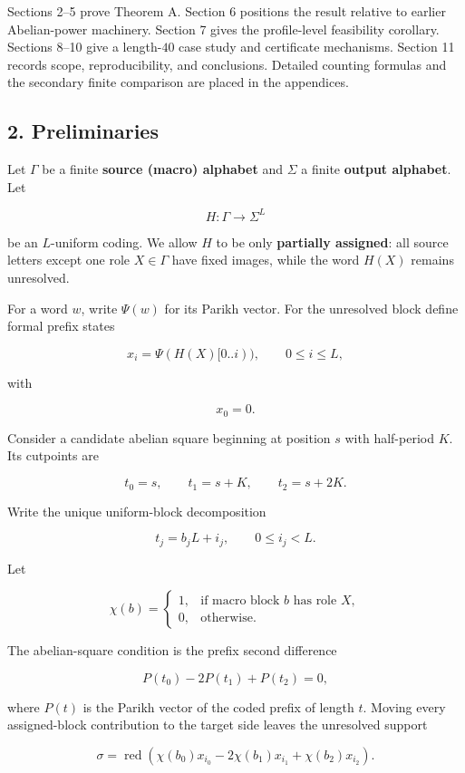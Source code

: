 \documentclass[
  british,
  a4paper,
  11pt]{article}
\begin{document}
Sections 2--5 prove Theorem A. Section 6 positions the result relative
to earlier Abelian-power machinery. Section 7 gives the profile-level
feasibility corollary. Sections 8--10 give a length-\(40\) case study
and certificate mechanisms. Section 11 records scope, reproducibility,
and conclusions. Detailed counting formulas and the secondary finite
comparison are placed in the appendices.

\subsection{2. Preliminaries}\label{preliminaries}

Let \(\Gamma\) be a finite \textbf{source (macro) alphabet} and
\(\Sigma\) a finite \textbf{output alphabet}. Let

\[
H:\Gamma\to\Sigma^L
\]

be an \(L\)-uniform coding. We allow \(H\) to be only \textbf{partially
assigned}: all source letters except one role \(X\in\Gamma\) have fixed
images, while the word \(H(X)\) remains unresolved.

For a word \(w\), write \(\Psi(w)\) for its Parikh vector. For the
unresolved block define formal prefix states

\[
x_i=\Psi(H(X)[0..i)),
\qquad
0\le i\le L,
\]

with

\[
x_0=0.
\]

Consider a candidate abelian square beginning at position \(s\) with
half-period \(K\). Its cutpoints are

\[
t_0=s,\qquad t_1=s+K,\qquad t_2=s+2K.
\]

Write the unique uniform-block decomposition

\[
t_j=b_jL+i_j,
\qquad
0\le i_j<L.
\]

Let

\[
\chi(b)=
\begin{cases}
1,&\text{if macro block }b\text{ has role }X,\\
0,&\text{otherwise.}
\end{cases}
\]

The abelian-square condition is the prefix second difference

\[
P(t_0)-2P(t_1)+P(t_2)=0,
\]

where \(P(t)\) is the Parikh vector of the coded prefix of length \(t\).
Moving every assigned-block contribution to the target side leaves the
unresolved support

\[
\sigma
=
\operatorname{red}
\left(
\chi(b_0)x_{i_0}
-2\chi(b_1)x_{i_1}
+\chi(b_2)x_{i_2}
\right).
\tag{2.1}
\]
\end{document}
